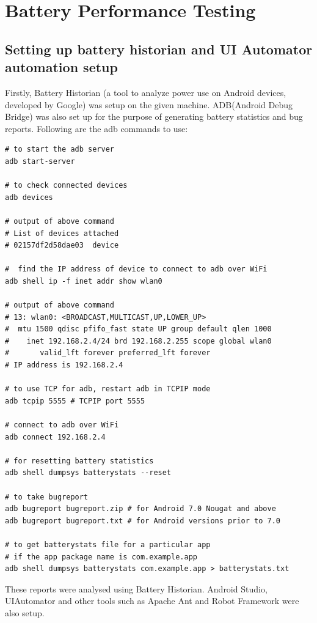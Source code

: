\setlength\parindent{0pt}

\chapter{Battery Performance Testing}

\section{Setting up battery historian and UI Automator automation setup} Firstly, Battery Historian (a tool to analyze power use on Android devices, developed by Google) was setup on the given machine. ADB(Android Debug Bridge) was also set up for the purpose of generating battery statistics and bug reports. Following are the adb commands to use:\cite{adb}
\begin{lstlisting}[style=ShellStyle]
# to start the adb server
adb start-server

# to check connected devices
adb devices

# output of above command
# List of devices attached
# 02157df2d58dae03	device

#  find the IP address of device to connect to adb over WiFi
adb shell ip -f inet addr show wlan0

# output of above command
# 13: wlan0: <BROADCAST,MULTICAST,UP,LOWER_UP> 
#  mtu 1500 qdisc pfifo_fast state UP group default qlen 1000
#    inet 192.168.2.4/24 brd 192.168.2.255 scope global wlan0
#       valid_lft forever preferred_lft forever
# IP address is 192.168.2.4

# to use TCP for adb, restart adb in TCPIP mode
adb tcpip 5555 # TCPIP port 5555

# connect to adb over WiFi
adb connect 192.168.2.4

# for resetting battery statistics
adb shell dumpsys batterystats --reset

# to take bugreport
adb bugreport bugreport.zip # for Android 7.0 Nougat and above
adb bugreport bugreport.txt # for Android versions prior to 7.0 

# to get batterystats file for a particular app 
# if the app package name is com.example.app
adb shell dumpsys batterystats com.example.app > batterystats.txt
\end{lstlisting}
These reports were analysed using Battery Historian. Android Studio, UIAutomator and other tools such as Apache Ant and Robot Framework were also setup.
\\

